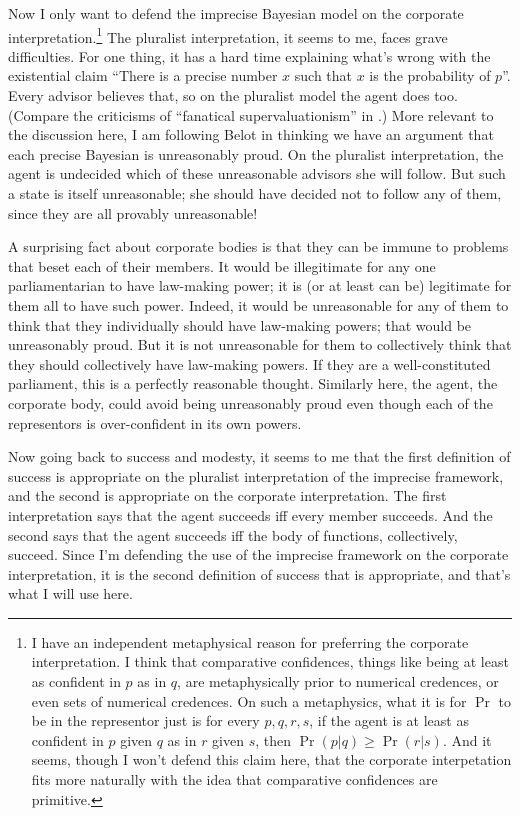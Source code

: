 Now I only want to defend the imprecise Bayesian model on the corporate interpretation.\footnote{\label{Corporate}I have an independent metaphysical reason for preferring the corporate interpretation. I think that comparative confidences, things like being at least as confident in $p$ as in $q$, are metaphysically prior to numerical credences, or even sets of numerical credences. On such a metaphysics, what it is for $\Pr$ to be in the representor just is for every $p, q, r, s$, if the agent is at least as confident in $p$ given $q$ as in $r$ given $s$, then $\Pr(p | q) \geq \Pr(r | s)$. And it seems, though I won't defend this claim here, that the corporate interpetation fits more naturally with the idea that comparative confidences are primitive.} The pluralist interpretation, it seems to me, faces grave difficulties. For one thing, it has a hard time explaining what's wrong with the existential claim ``There is a precise number $x$ such that $x$ is the probability of $p$''. Every advisor believes that, so on the pluralist model the agent does too. (Compare the criticisms of ``fanatical supervaluationism'' in \citet{Lewis1993c}.) More relevant to the discussion here, I am following Belot in thinking we have an argument that each precise Bayesian is unreasonably proud. On the pluralist interpretation, the agent is undecided which of these unreasonable advisors she will follow. But such a state is itself unreasonable; she should have decided not to follow any of them, since they are all provably unreasonable!

A surprising fact about corporate bodies is that they can be immune to problems that beset each of their members. It would be illegitimate for any one parliamentarian to have law-making power; it is (or at least can be) legitimate for them all to have such power. Indeed, it would be unreasonable for any of them to think that they individually should have law-making powers; that would be unreasonably proud. But it is not unreasonable for them to collectively think that they should collectively have law-making powers. If they are a well-constituted parliament, this is a perfectly reasonable thought. Similarly here, the agent, the corporate body, could avoid being unreasonably proud even though each of the representors is over-confident in its own powers.

Now going back to success and modesty, it seems to me that the first definition of success is appropriate on the pluralist interpretation of the imprecise framework, and the second is appropriate on the corporate interpretation. The first interpretation says that the agent succeeds iff every member succeeds. And the second says that the agent succeeds iff the body of functions, collectively, succeed. Since I'm defending the use of the imprecise framework on the corporate interpretation, it is the second definition of success that is appropriate, and that's what I will use here.


